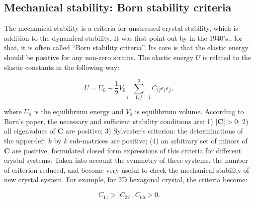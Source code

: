 \subsection{Mechanical stability: Born stability criteria}

The mechanical stability is a criteria for unstressed crystal stability, which is addition to the dynamical stability. It was first point out by \citet{born_1940} in the 1940’s., for that, it is often called “Born stability criteria”. Its core is that the elastic energy should be positive for any non-zero strains. The elastic energy $U$ is related to the elastic constants in the following way:

\begin{equation}
U=U_0+\frac{1}{2}V_0\sum_{i=1,j=1}^6 C_{ij}\epsilon_i\epsilon_j,
\end{equation}

where $U_0$ is the equilibrium energy and $V_0$ is equilibrium volume. According to Born's paper\cite{born_1940}, the necessary and sufficient stability conditions are: 1) $|\mathbf{C}|>0$; 2) all eigenvalues of $\mathbf{C}$ are positive; 3) Sylvester’s criterion: the determinations of the upper-left $k$ by $k$ sub-matrices are positive; (4) an arbitrary set of minors of $\mathbf{C}$ are positive. \citet{Mouhat2014} formulated closed form expressions of this criteria for different crystal systems. Taken into account the symmetry of these systems, the number of criterion reduced, and become very useful to check the mechanical stability of new crystal system. For example, for 2D hexagonal crystal, the criteria become:

\begin{equation}
C_{11}>|C_{22}|,C_{66}>0.
\end{equation}